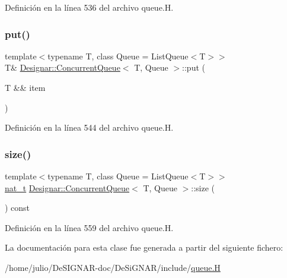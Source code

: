 Definición en la línea 536 del archivo queue.\+H.

\mbox{\label{class_designar_1_1_concurrent_queue_aacc6c771061780c42058303f300b5acb}} 
\subsubsection{\texorpdfstring{put()}{put()}\hspace{0.1cm}{\footnotesize\ttfamily [2/2]}}
{\footnotesize\ttfamily template$<$typename T, class Queue = List\+Queue$<$\+T$>$$>$ \\
T\& \hyperlink{class_designar_1_1_concurrent_queue}{Designar\+::\+Concurrent\+Queue}$<$ T, Queue $>$\+::put (\begin{DoxyParamCaption}\item[{T \&\&}]{item }\end{DoxyParamCaption})\hspace{0.3cm}{\ttfamily [inline]}}



Definición en la línea 544 del archivo queue.\+H.

\mbox{\label{class_designar_1_1_concurrent_queue_acbeaea381f53471ea17366ab7a5fc52d}} 
\subsubsection{\texorpdfstring{size()}{size()}}
{\footnotesize\ttfamily template$<$typename T, class Queue = List\+Queue$<$\+T$>$$>$ \\
\hyperlink{namespace_designar_aa72662848b9f4815e7bf31a7cf3e33d1}{nat\+\_\+t} \hyperlink{class_designar_1_1_concurrent_queue}{Designar\+::\+Concurrent\+Queue}$<$ T, Queue $>$\+::size (\begin{DoxyParamCaption}{ }\end{DoxyParamCaption}) const\hspace{0.3cm}{\ttfamily [inline]}}



Definición en la línea 559 del archivo queue.\+H.



La documentación para esta clase fue generada a partir del siguiente fichero\+:\begin{DoxyCompactItemize}
\item 
/home/julio/\+De\+S\+I\+G\+N\+A\+R-\/doc/\+De\+Si\+G\+N\+A\+R/include/\hyperlink{queue_8_h}{queue.\+H}\end{DoxyCompactItemize}
